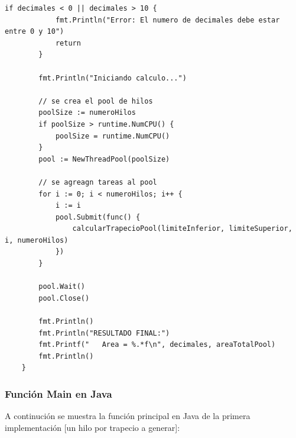 \begin{lstlisting}[style=cpp-style, caption={Función Main en TrapecioPool.go }]
        if decimales < 0 || decimales > 10 {
            fmt.Println("Error: El numero de decimales debe estar entre 0 y 10")
            return
        }
        
        fmt.Println("Iniciando calculo...")
        
        // se crea el pool de hilos
        poolSize := numeroHilos
        if poolSize > runtime.NumCPU() {
            poolSize = runtime.NumCPU()
        }
        pool := NewThreadPool(poolSize)
        
        // se agreagn tareas al pool
        for i := 0; i < numeroHilos; i++ {
            i := i 
            pool.Submit(func() {
                calcularTrapecioPool(limiteInferior, limiteSuperior, i, numeroHilos)
            })
        }
        
        pool.Wait()
        pool.Close()
        
        fmt.Println()
        fmt.Println("RESULTADO FINAL:")
        fmt.Printf("   Area = %.*f\n", decimales, areaTotalPool)
        fmt.Println()
    }
\end{lstlisting}

\subsubsection {Función Main en Java}

A continución se muestra la función principal en Java de la primera implementación [un hilo por trapecio a generar]:

